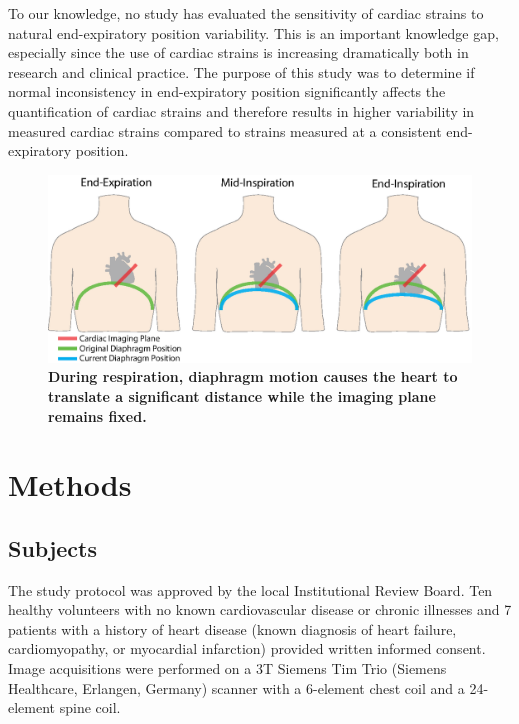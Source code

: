 	To our knowledge, no study has evaluated the sensitivity of cardiac strains to natural end-expiratory position variability. This is an important knowledge gap, especially since the use of cardiac strains is increasing dramatically both in research and clinical practice. The purpose of this study was to determine if normal inconsistency in end-expiratory position significantly affects the quantification of cardiac strains and therefore results in higher variability in measured cardiac strains compared to strains measured at a consistent end-expiratory position.
	
	\begin{figure} 
		\includegraphics{figures/strainpaper/Fig1-range_of_diaphragm_position_breathing}
		\caption[During respiration, diaphragm motion causes the heart to translate a significant distance while the imaging plane remains fixed]{\textbf{During respiration, diaphragm motion causes the heart to translate a significant distance while the imaging plane remains fixed.}}
		\label{fig:diaphragmTranslation}
	\end{figure}

\section{Methods}

\subsection{Subjects}
	The study protocol was approved by the local Institutional Review Board. Ten healthy volunteers with no known cardiovascular disease or chronic illnesses and 7 patients with a history of heart disease (known diagnosis of heart failure, cardiomyopathy, or myocardial infarction) provided written informed consent. Image acquisitions were performed on a 3T Siemens Tim Trio (Siemens Healthcare, Erlangen, Germany) scanner with a 6-element chest coil and a 24-element spine coil.

